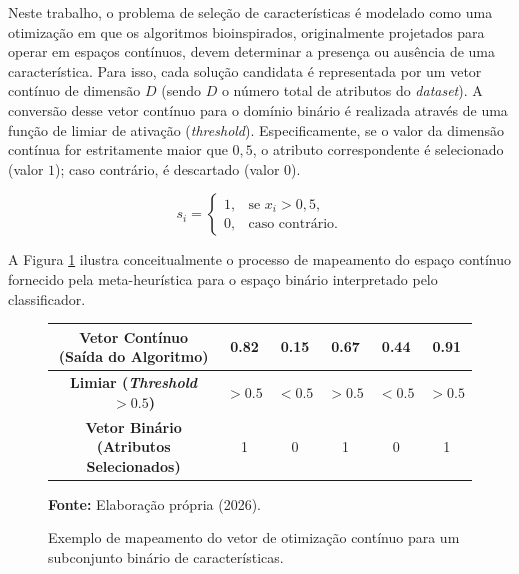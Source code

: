 \documentclass[12pt, a4paper, oneside]{report}
\begin{document}
Neste trabalho, o problema de seleção de características é modelado como uma otimização em que os algoritmos bioinspirados, originalmente projetados para operar em espaços contínuos, devem determinar a presença ou ausência de uma característica. Para isso, cada solução candidata é representada por um vetor contínuo de dimensão $D$ (sendo $D$ o número total de atributos do \textit{dataset}). A conversão desse vetor contínuo para o domínio binário é realizada através de uma função de limiar de ativação (\textit{threshold}). Especificamente, se o valor da dimensão contínua for estritamente maior que $0,5$, o atributo correspondente é selecionado (valor $1$); caso contrário, é descartado (valor $0$).

\begin{equation} 
s_i = \begin{cases} 1, & \text{se } x_i > 0{,}5,\\ 0, & \text{caso contrário.} \end{cases} 
\end{equation}

A Figura \ref{fig:vetor_selecao} ilustra conceitualmente o processo de mapeamento do espaço contínuo fornecido pela meta-heurística para o espaço binário interpretado pelo classificador.

\begin{figure}[htbp]
    \centering
    \caption{Exemplo de mapeamento do vetor de otimização contínuo para um subconjunto binário de características.}
    \vspace{0.2cm}
    \begin{tabular}{|c|c|c|c|c|c|}
        \hline
        \textbf{Vetor Contínuo (Saída do Algoritmo)} & 0.82 & 0.15 & 0.67 & 0.44 & 0.91 \\
        \hline
        \textbf{Limiar (\textit{Threshold} $> 0.5$)} & $> 0.5$ & $< 0.5$ & $> 0.5$ & $< 0.5$ & $> 0.5$ \\
        \hline
        \textbf{Vetor Binário (Atributos Selecionados)} & 1 & 0 & 1 & 0 & 1 \\
        \hline
    \end{tabular}
    \par\vspace{0.2cm}
    \centerline{\small \textbf{Fonte:} Elaboração própria (2026).}
    \label{fig:vetor_selecao}
\end{figure}
\end{document}
